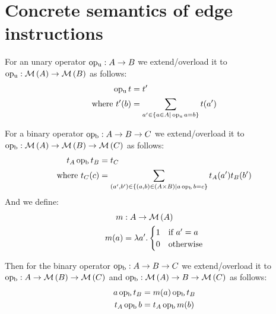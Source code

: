 \section{Concrete semantics of edge instructions}\label{sec:concrete-semantics}

For an unary operator $\operatorname{op_u} : A \rightarrow B$ we extend/overload it to $\operatorname{op_u} : \mathcal{M}\left(A\right) \rightarrow \mathcal{M}\left(B\right)$ as follows:
\begin{align}
    \operatorname{op_u} t &= t' \\
    \text{where } t'(b) &= \sum_{a' \in \{a \in A | \operatorname{op_u} a = b\}} t(a')
\end{align}

For a binary operator $\operatorname{op_b} : A \rightarrow B \rightarrow C$ we extend/overload it to $\operatorname{op_b} : \mathcal{M}\left(A\right) \rightarrow \mathcal{M}\left(B\right) \rightarrow \mathcal{M}\left(C\right)$ as follows:
\begin{align}
    t_A \operatorname{op_b} t_B &= t_C \\
    \text{where } t_C(c) &= \sum_{(a', b') \in \{(a,b) \in (A \times B) | a \operatorname{op_b} b = c\}} t_A(a') t_B(b')
\end{align}
And we define:
\begin{align}
    m &: A \rightarrow \mathcal{M}\left(A\right) \\
    m(a) &= \lambda a'. \begin{cases}
        1 & \text{if } a' = a\\
        0 & \text{otherwise}
    \end{cases}
\end{align}

Then for the binary operator $\operatorname{op_b} : A \rightarrow B \rightarrow C$ we extend/overload it to $\operatorname{op_b} : A \rightarrow \mathcal{M}\left(B\right) \rightarrow \mathcal{M}\left(C\right)$ and $\operatorname{op_b} : \mathcal{M}\left(A\right) \rightarrow B \rightarrow \mathcal{M}\left(C\right)$ as follows:
\begin{align}
    a \operatorname{op_b} t_B &= m(a) \operatorname{op_b} t_B \\
    t_A \operatorname{op_b} b &= t_A \operatorname{op_b} m(b)
\end{align}



